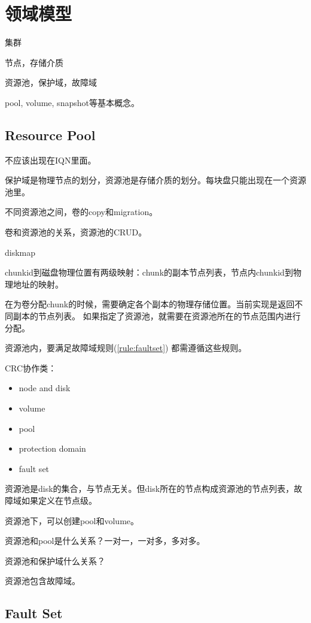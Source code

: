 \chapter{领域模型}

集群

节点，存储介质

资源池，保护域，故障域

pool, volume, snapshot等基本概念。

\section{Resource Pool}

不应该出现在IQN里面。

保护域是物理节点的划分，资源池是存储介质的划分。每块盘只能出现在一个资源池里。

不同资源池之间，卷的copy和migration。

卷和资源池的关系，资源池的CRUD。

diskmap

chunkid到磁盘物理位置有两级映射：chunk的副本节点列表，节点内chunkid到物理地址的映射。

在为卷分配chunk的时候，需要确定各个副本的物理存储位置。当前实现是返回不同副本的节点列表。
如果指定了资源池，就需要在资源池所在的节点范围内进行分配。

资源池内，要满足故障域规则(\ref{rule:faultset})
都需遵循这些规则。

CRC协作类：
\begin{itemize}
    \item node and disk
    \item volume
    \item pool
    \item protection domain
    \item fault set
\end{itemize}

资源池是disk的集合，与节点无关。但disk所在的节点构成资源池的节点列表，故障域如果定义在节点级。

资源池下，可以创建pool和volume。

资源池和pool是什么关系？一对一，一对多，多对多。

资源池和保护域什么关系？

资源池包含故障域。

\section{Fault Set}

